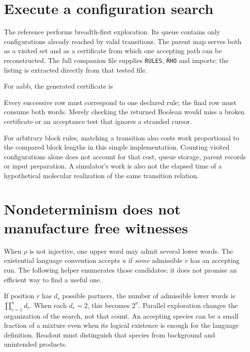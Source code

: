 \section{Execute a configuration search}
The reference performs breadth-first exploration. Its queue contains only
configurations already reached by valid transitions. The parent map serves
both as a visited set and as a certificate from which one accepting path can
be reconstructed. The full companion file supplies \texttt{RULES}, \texttt{RHO}
and imports; the listing is extracted directly from that tested file.

For aabb, the generated certificate is
\begin{center}\end{center}
Every successive row must correspond to one declared rule; the final row must
consume both words. Merely checking the returned Boolean would miss a broken
certificate or an acceptance test that ignores a stranded cursor.

For arbitrary block rules, matching a transition also costs work proportional
to the compared block lengths in this simple implementation. Counting visited
configurations alone does not account for that cost, queue storage, parent
records or input preparation. A simulator's work is also not the elapsed time
of a hypothetical molecular realization of the same transition relation.

\section{Nondeterminism does not manufacture free witnesses}
When $\rho$ is not injective, one upper word may admit several lower words.
The existential language convention accepts $u$ if \emph{some} admissible
$v$ has an accepting run. The following helper enumerates those candidates;
it does not promise an efficient way to find a useful one.


If position $r$ has $d_r$ possible partners, the number of admissible lower
words is $\prod_{r=1}^{n}d_r$. When each $d_r=2$, this becomes $2^n$.
Parallel exploration changes the organization of the search, not that count.
An accepting species can be a small fraction of a mixture even when its
logical existence is enough for the language definition. Readout must
distinguish that species from background and unintended products.

